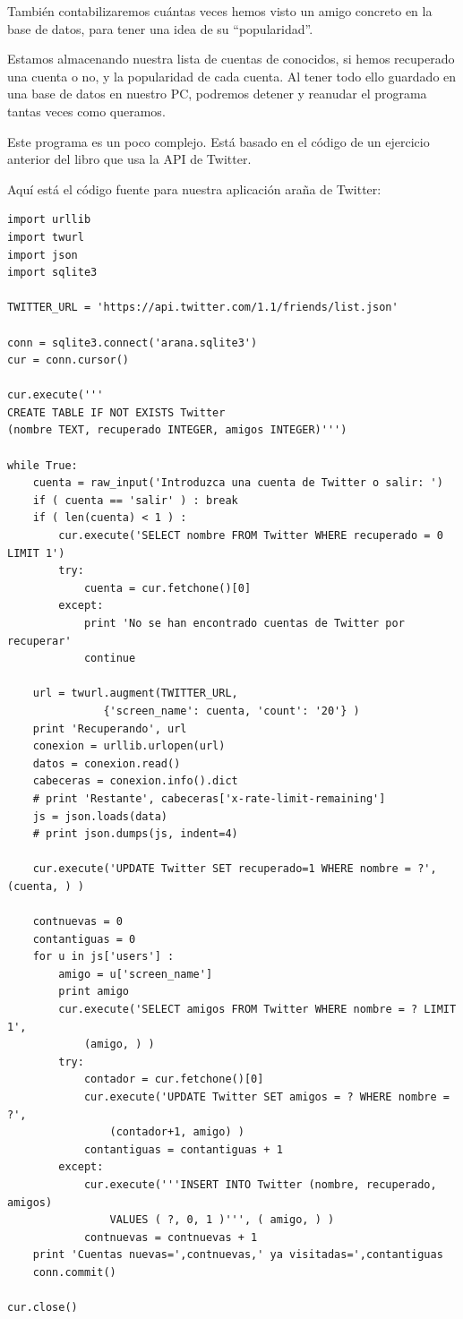 También contabilizaremos cuántas veces hemos visto un amigo concreto en la
base de datos, para tener una idea de su ``popularidad''.

Estamos almacenando nuestra lista de cuentas de conocidos,
si hemos recuperado una cuenta o no,
y la popularidad de cada cuenta.
Al tener todo ello guardado en una base de datos en nuestro PC,
podremos detener y reanudar el programa tantas veces como queramos.

Este programa es un poco complejo. Está basado en el código
de un ejercicio anterior del libro que usa la
API de Twitter.

Aquí está el código fuente para nuestra aplicación araña de Twitter:

\beforeverb
\begin{verbatim}
import urllib
import twurl
import json
import sqlite3

TWITTER_URL = 'https://api.twitter.com/1.1/friends/list.json'

conn = sqlite3.connect('arana.sqlite3')
cur = conn.cursor()

cur.execute('''
CREATE TABLE IF NOT EXISTS Twitter 
(nombre TEXT, recuperado INTEGER, amigos INTEGER)''')

while True:
    cuenta = raw_input('Introduzca una cuenta de Twitter o salir: ')
    if ( cuenta == 'salir' ) : break
    if ( len(cuenta) < 1 ) :
        cur.execute('SELECT nombre FROM Twitter WHERE recuperado = 0 LIMIT 1')
        try:
            cuenta = cur.fetchone()[0]
        except:
            print 'No se han encontrado cuentas de Twitter por recuperar'
            continue

    url = twurl.augment(TWITTER_URL, 
               {'screen_name': cuenta, 'count': '20'} )
    print 'Recuperando', url
    conexion = urllib.urlopen(url)
    datos = conexion.read()
    cabeceras = conexion.info().dict
    # print 'Restante', cabeceras['x-rate-limit-remaining']
    js = json.loads(data)
    # print json.dumps(js, indent=4)

    cur.execute('UPDATE Twitter SET recuperado=1 WHERE nombre = ?', (cuenta, ) )

    contnuevas = 0
    contantiguas = 0
    for u in js['users'] :
        amigo = u['screen_name']
        print amigo
        cur.execute('SELECT amigos FROM Twitter WHERE nombre = ? LIMIT 1', 
            (amigo, ) )
        try:
            contador = cur.fetchone()[0]
            cur.execute('UPDATE Twitter SET amigos = ? WHERE nombre = ?', 
                (contador+1, amigo) )
            contantiguas = contantiguas + 1
        except:
            cur.execute('''INSERT INTO Twitter (nombre, recuperado, amigos) 
                VALUES ( ?, 0, 1 )''', ( amigo, ) )
            contnuevas = contnuevas + 1
    print 'Cuentas nuevas=',contnuevas,' ya visitadas=',contantiguas
    conn.commit()

cur.close()
\end{verbatim}
